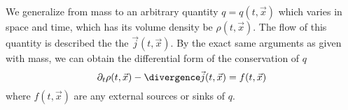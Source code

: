 \begin{node}
\begin{node}[In general]\label{pde:first-order-0002}%
We generalize from mass to an arbitrary quantity $q=q(t,\vec{x})$ which
varies in space and time, which has its volume density be
$\rho(t,\vec{x})$. The flow of this quantity is described the the
 $\vec{j}(t,\vec{x})$. By the exact same arguments
as given with mass, we can obtain the differential form of the
conservation of $q$
\begin{equation*}
\partial_{t}\rho(t,\vec{x})-\divergence\vec{j}(t,\vec{x})=f(t,\vec{x})
\end{equation*}
where $f(t,\vec{x})$ are any external sources or sinks of $q$.
\end{node}
\end{node}
